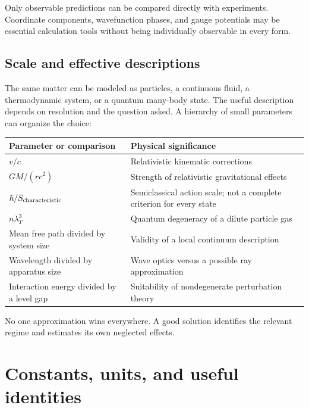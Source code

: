 \documentclass[11pt,oneside]{book}
\theoremstyle{reviewstyle}
\begin{document}
Only observable predictions can be compared directly with experiments. Coordinate components, wavefunction phases, and gauge potentials may be essential calculation tools without being individually observable in every form.
\section{Scale and effective descriptions}
The same matter can be modeled as particles, a continuous fluid, a thermodynamic system, or a quantum many-body state. The useful description depends on resolution and the question asked. A hierarchy of small parameters can organize the choice:
\begin{center}
\begin{tabular}{p{}p{}}
\toprule
Parameter or comparison & Physical significance\\
\midrule
$v/c$ & Relativistic kinematic corrections\\
$GM/(rc^2)$ & Strength of relativistic gravitational effects\\
$\hbar/S_{\rm characteristic}$ & Semiclassical action scale; not a complete criterion for every state\\
$n\lambda_T^3$ & Quantum degeneracy of a dilute particle gas\\
Mean free path divided by system size & Validity of a local continuum description\\
Wavelength divided by apparatus size & Wave optics versus a possible ray approximation\\
Interaction energy divided by a level gap & Suitability of nondegenerate perturbation theory\\
\bottomrule
\end{tabular}
\end{center}
No one approximation wins everywhere. A good solution identifies the relevant regime and estimates its own neglected effects.

\appendix
\chapter{Constants, units, and useful identities}
\end{document}
